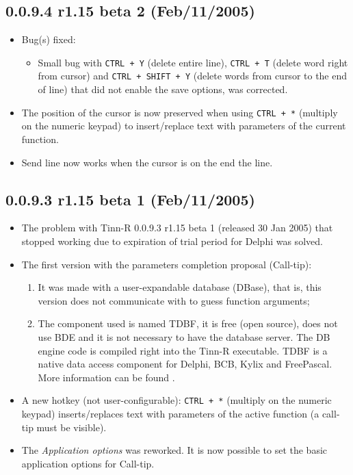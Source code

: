 \subsection*{0.0.9.4 r1.15 beta 2 (Feb/11/2005)}
\begin{itemize}
  \item Bug(s) fixed:
    \begin{itemize}
      \item Small bug with \texttt{CTRL + Y} (delete entire line),
        \texttt{CTRL + T} (delete word right from cursor) and \texttt{CTRL + SHIFT + Y}
        (delete words from cursor to the end of line) that did not enable the save options, was corrected.
    \end{itemize}
  \item The position of the cursor is now preserved when using \texttt{CTRL + *} (multiply on the numeric keypad)
    to insert/replace text with parameters of the current \RR{} function.
  \item Send line now works when the cursor is on the end the line.
\end{itemize}

\subsection*{0.0.9.3 r1.15 beta 1 (Feb/11/2005)}
\begin{itemize}
  \item The problem with Tinn-R 0.0.9.3 r1.15 beta 1 (released 30 Jan 2005) that stopped working due to expiration
    of trial period for Delphi was solved.
  \item The first version with the \RR{} parameters completion proposal (Call-tip):
    \begin{enumerate}
      \item It was made with a user-expandable database (DBase), that is, this version does not communicate with
        \RR{} to guess \RR{} function arguments;
      \item The component used is named TDBF, it is free (open source), does not use BDE and it is not necessary
        to have the database server. The DB engine code is compiled right into the Tinn-R executable.
        TDBF is a native data access component for Delphi, BCB, Kylix and FreePascal.
        More information can be found .
    \end{enumerate}
  \item A new hotkey (not user-configurable): \texttt{CTRL + *} (multiply on the numeric keypad) inserts/replaces
    text with parameters of the active function (a call-tip must be visible).
  \item The \textit{Application options} was reworked. It is now possible to set the basic
    application options for \RR{} Call-tip.
\end{itemize}

